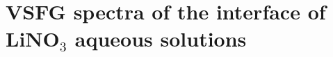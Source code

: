 \section{VSFG spectra of the interface of LiNO$_3$ aqueous solutions} \label{sfg_lino3_interface}
%

